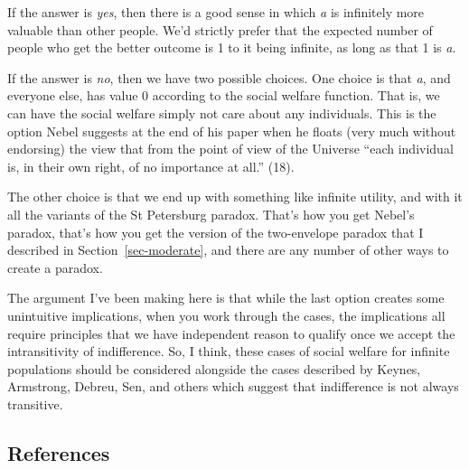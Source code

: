 \documentclass[
  11pt,
  letterpaper,
  DIV=11,
  numbers=noendperiod,
  twoside]{scrartcl}
\begin{document}
If the answer is \emph{yes}, then there is a good sense in which
\emph{a} is infinitely more valuable than other people. We'd strictly
prefer that the expected number of people who get the better outcome is
1 to it being infinite, as long as that 1 is \emph{a}.

If the answer is \emph{no}, then we have two possible choices. One
choice is that \emph{a}, and everyone else, has value 0 according to the
social welfare function. That is, we can have the social welfare simply
not care about any individuals. This is the option Nebel suggests at the
end of his paper when he floats (very much without endorsing) the view
that from the point of view of the Universe ``each individual is, in
their own right, of no importance at all.'' (18).

The other choice is that we end up with something like infinite utility,
and with it all the variants of the St Petersburg paradox. That's how
you get Nebel's paradox, that's how you get the version of the
two-envelope paradox that I described in Section~\ref{sec-moderate}, and
there are any number of other ways to create a paradox.

The argument I've been making here is that while the last option creates
some unintuitive implications, when you work through the cases, the
implications all require principles that we have independent reason to
qualify once we accept the intransitivity of indifference. So, I think,
these cases of social welfare for infinite populations should be
considered alongside the cases described by Keynes, Armstrong, Debreu,
Sen, and others which suggest that indifference is not always
transitive.

\subsection*{References}\label{references}
\end{document}
